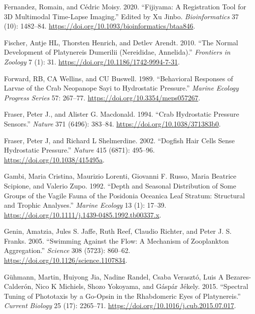 \documentclass[
]{article}
\newlength{\cslhangindent}
\newlength{\cslentryspacingunit} %
\newenvironment{CSLReferences}[2] %
 {%
  \setlength{\parindent}{0pt}
  \ifodd #1
  \let\oldpar\par
  \def\par{\hangindent=\cslhangindent\oldpar}
  \fi
  \setlength{\parskip}{#2\cslentryspacingunit}
 }%
 {}
\begin{document}
\begin{CSLReferences}{1}{0}
\leavevmode{}%
Fernandez, Romain, and Cédric Moisy. 2020. {``Fijiyama: A Registration
Tool for 3D Multimodal Time-Lapse Imaging.''} Edited by Xu Jinbo.
\emph{Bioinformatics} 37 (10): 1482--84.
\url{https://doi.org/10.1093/bioinformatics/btaa846}.

\leavevmode{}%
Fischer, Antje HL, Thorsten Henrich, and Detlev Arendt. 2010. {``The
Normal Development of Platynereis Dumerilii (Nereididae, Annelida).''}
\emph{Frontiers in Zoology} 7 (1): 31.
\url{https://doi.org/10.1186/1742-9994-7-31}.

\leavevmode{}%
Forward, RB, CA Wellins, and CU Buswell. 1989. {``Behavioral Responses
of Larvae of the Crab Neopanope Sayi to Hydrostatic Pressure.''}
\emph{Marine Ecology Progress Series} 57: 267--77.
\url{https://doi.org/10.3354/meps057267}.

\leavevmode{}%
Fraser, Peter J., and Alister G. Macdonald. 1994. {``Crab Hydrostatic
Pressure Sensors.''} \emph{Nature} 371 (6496): 383--84.
\url{https://doi.org/10.1038/371383b0}.

\leavevmode{}%
Fraser, Peter J, and Richard L Shelmerdine. 2002. {``Dogfish Hair Cells
Sense Hydrostatic Pressure.''} \emph{Nature} 415 (6871): 495--96.
\url{https://doi.org/10.1038/415495a}.

\leavevmode{}%
Gambi, Maria Cristina, Maurizio Lorenti, Giovanni F. Russo, Maria
Beatrice Scipione, and Valerio Zupo. 1992. {``Depth and Seasonal
Distribution of Some Groups of the Vagile Fauna of the Posidonia
Oceanica Leaf Stratum: Structural and Trophic Analyses.''} \emph{Marine
Ecology} 13 (1): 17--39.
\url{https://doi.org/10.1111/j.1439-0485.1992.tb00337.x}.

\leavevmode{}%
Genin, Amatzia, Jules S. Jaffe, Ruth Reef, Claudio Richter, and Peter J.
S. Franks. 2005. {``Swimming Against the Flow: A Mechanism of
Zooplankton Aggregation.''} \emph{Science} 308 (5723): 860--62.
\url{https://doi.org/10.1126/science.1107834}.

\leavevmode{}%
Gühmann, Martin, Huiyong Jia, Nadine Randel, Csaba Verasztó, Luis A
Bezares-Calderón, Nico K Michiels, Shozo Yokoyama, and Gáspár Jékely.
2015. {``Spectral Tuning of Phototaxis by a Go-Opsin in the Rhabdomeric
Eyes of Platynereis.''} \emph{Current Biology} 25 (17): 2265--71.
\url{https://doi.org/10.1016/j.cub.2015.07.017}.


\end{CSLReferences}
\end{document}
